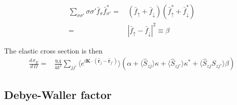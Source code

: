 \documentclass[11pt,letter]{article}
\newcommand{\bv}[1]{\ensuremath{\mathbf{#1}}}
\newcommand{\dsig}[1]{\ensuremath{ \frac{ d\,\sigma_{#1} }{d\,\Omega} }}
\begin{document}
\begin{equation}
\begin{split}
\sum_{\sigma\sigma'} \sigma\sigma' \bar{f}_{\sigma} \bar{f}_{\sigma'}^{*} = &\, 
            (\bar{f}_{\uparrow} + \bar{f}_{\downarrow})( \bar{f}_{\uparrow}^{*} + \bar{f}_{\downarrow}^{*} ) \\
       =&\,  | \bar{f}_{\uparrow} - \bar{f}_{\downarrow} | ^{2} \equiv \beta
\end{split} 
\end{equation}

The elastic cross section is then 
\begin{equation}
\begin{split}
\dsig{E} =&   \frac{9\Lambda}{4k^{2}} 
               \sum_{ j j' }  \langle 
              e^{ i \bv{K} \cdot ( \hat{\bv{r}}_{j} - \hat{\bv{r}}_{j'} )  } \rangle 
             \left( \alpha + \langle \hat{S}_{zj}\rangle \kappa + \langle \hat{S}_{zj'} \rangle \kappa^{*} 
                     + \langle \hat{S}_{zj} \hat{S}_{zj'} \rangle \beta \right)   
\end{split}
\end{equation}

\subsection{Debye-Waller factor} 
\end{document}
